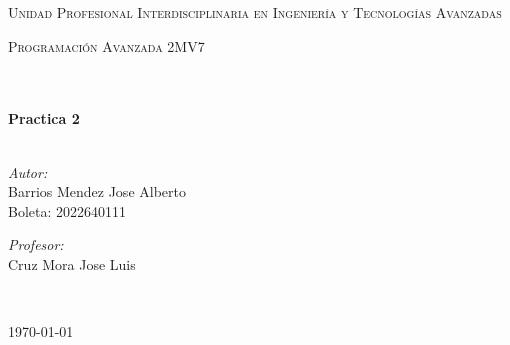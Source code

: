 \documentclass[12pt]{article}
\begin{document}
\begin{center}
\textsc{\LARGE Unidad Profesional Interdisciplinaria en Ingenier\'ia y				%
Tecnolog\'ias Avanzadas}\\[1.5cm]													%

\begin{minipage}{0.9\textwidth} 
\begin{center}																					%
\textsc{\LARGE Programación Avanzada 2MV7}
\end{center}
\end{minipage}\\[0.5cm]
 			\vspace*{1cm}																		%
\HRule \\[0.4cm]																	%
{ \huge \bfseries Practica 2}\\[0.4cm]	%
\HRule \\[1.5cm]																	%
\begin{minipage}{0.46\textwidth}													%
\begin{flushleft} \large															%
\emph{Autor:}\\	
Barrios Mendez Jose Alberto\\
Boleta: 2022640111


\end{flushleft}																		%
\end{minipage}		
\begin{minipage}{0.52\textwidth}		
\vspace{-0.6cm}											%
\begin{flushright} \large															%
\emph{Profesor:} \\																	%
Cruz Mora Jose Luis\\
\end{flushright}																	%
\end{minipage}	
\vspace*{1cm}
 	
 		\\																		%
\vspace{2cm} 																				
\begin{center}																					
{\large \today}																	%
 			\end{center}												  						
\end{center}							 											
																					
\end{document}
